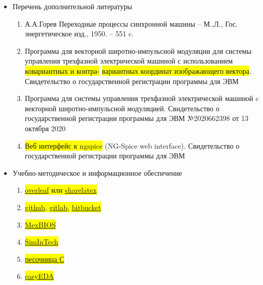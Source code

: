 \begin{itemize}
\begin{enumerate}
\end{enumerate}
\item Перечень дополнительной литературы
\begin{enumerate}
          \item \small{\footnotesize{А.А.Горев Переходные процессы синхронной машины -- М.,Л., Гос. энергетическое изд., 1950. -- 551 c.}}
          \item \small{\footnotesize{Программа для векторной широтно-импульсной модуляции для системы управления трехфазной электрической машиной с использованием \colorbox{yellow}{ковариантных и контра-}
                   \colorbox{yellow}{вариантных координат изображающего вектора}. Свидетельство о государственной регистрации программы для ЭВМ}}
          \item \small{\footnotesize{Программа для системы управления трехфазной электрической машиной c векторной широтно-импульсной модуляцией. Свидетельство о государственной регистрации программы для ЭВМ №2020662398 от 13 октября 2020}}
          \item \small{\footnotesize{\colorbox{yellow}{Веб интерфейс к ngspice} (NG-Spice web interface). Свидетельство о государственной регистрации программы для ЭВМ}}
\end{enumerate}
\item Учебно-методическое и информационное обеспечение
\begin{enumerate}
        \item \colorbox{yellow}{\href{overleaf.com}{overleaf} или \href{sharelatex.com}{sharelatex}}
         \item \colorbox{yellow}{\href{github.com}{github}, \href{gitlab.com}{gitlab}, \href{bitbucket.org}{bitbucket}}
         \item \colorbox{yellow}{\href{https://mechatronica-pro.com/ru}{MexBIOS}}
         \item \colorbox{yellow}{\href{https://simintech.ru/}{SimInTech}}
         \item \colorbox{yellow}{\href{https://www.mycompiler.io/new/c}{песочница С}}
         \item \colorbox{yellow}{\href{https://easyeda.com/}{easyEDA}}

\end{enumerate}
\end{itemize}

